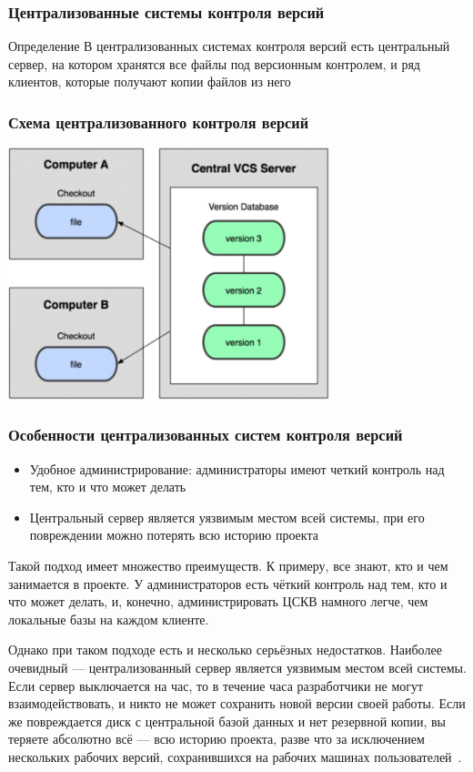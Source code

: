 \documentclass{../industrial-development}
\begin{document}
\begin{frame} \frametitle{Централизованные системы контроля версий}
  \begin{block}{Определение}
    В \alert{централизованных системах контроля версий} есть центральный сервер, на котором хранятся все файлы под версионным контролем, и ряд клиентов, которые получают копии файлов 
из него
  \end{block}
 
\end{frame}

\begin{frame} \frametitle{Схема централизованного контроля версий}
  \centerline{\includegraphics[width=0.7\textwidth]{centralizedVCS.pdf}}
\end{frame}

\begin{frame} \frametitle{Особенности централизованных систем контроля версий}
  \begin{itemize}
  \item Удобное администрирование: администраторы имеют четкий контроль над тем, кто и что может делать
  \item Центральный сервер является уязвимым местом всей системы, при его повреждении можно потерять всю историю проекта
  \end{itemize}
\end{frame}

\lecturenotes

Такой подход имеет множество преимуществ. К примеру, все знают, кто и чем занимается в проекте. У администраторов есть чёткий контроль над тем, кто и что может делать, и, конечно, администрировать ЦСКВ намного легче, чем локальные базы на каждом клиенте.

Однако при таком подходе есть и несколько серьёзных недостатков. Наиболее очевидный — централизованный сервер является уязвимым местом всей системы. Если сервер выключается на час, то в течение часа разработчики не могут взаимодействовать, и никто не может сохранить новой версии своей работы. Если же повреждается диск с центральной базой данных и нет резервной копии, вы теряете абсолютно всё — всю историю проекта, разве что за исключением нескольких рабочих версий, сохранившихся на рабочих машинах пользователей~\cite[с.~6--7]{ProGit}.
\end{document}
